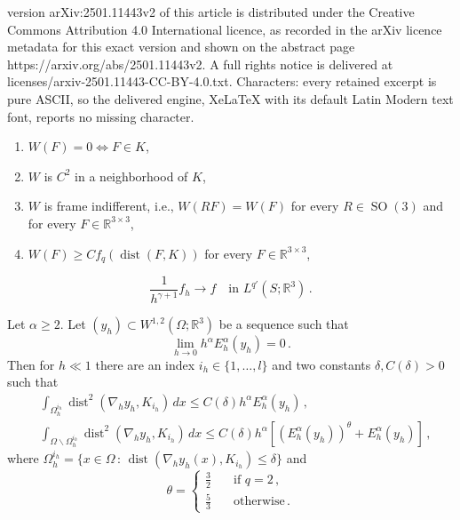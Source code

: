 \documentclass[10pt,a4paper]{amsart}
\DeclareMathOperator{\SO}{SO}
\DeclareMathOperator{\dist}{dist}
\renewcommand{\r}{\mathbb{R}}
\begin{document}
version arXiv:2501.11443v2 of this article is distributed under the Creative Commons Attribution 4.0 International licence, as recorded in the arXiv licence metadata for this exact version and shown on the abstract page https://arxiv.org/abs/2501.11443v2. A full rights notice is delivered at licenses/arxiv-2501.11443-CC-BY-4.0.txt. Characters: every retained excerpt is pure ASCII, so the delivered engine, XeLaTeX with its default Latin Modern text font, reports no missing character.
\begin{enumerate}[start=1,label={(W\arabic*)}]
    \item $W(F) = 0 \iff F \in K$, \label{item:minimization_W}
    \item $W$ is $C^2$ in a neighborhood of $K$, \label{item:regularity_W}
    \item $W$ is frame indifferent, i.e., $W(RF) = W(F)$ for every $R \in \SO(3)$ and for every $F \in \r^{3 \times 3}$, \label{item:frame_indifference}
    \item $W(F) \geq C f_q(\dist(F, K))$ for every $F \in \r^{3 \times 3}$, \label{item:lower_bound_W}
\end{enumerate}

\begin{equation}\label{eq:convergence_forces}
	\dfrac{1}{h^{\gamma+1}}f_h \to f \quad \text{in} \, \, L^{q'}(S; \r^3) \,.
\end{equation}

\begin{prop}\label{prop:compactness}
    Let $\alpha \geq 2$. Let $(y_h) \subset W^{1,2}(\Omega; \r^3)$ be a sequence such that
    \begin{equation}
        \lim_{h \to 0} h^\alpha E^\alpha_h(y_h) = 0 \label{eq:hypothesis_compactness}\,.
    \end{equation}
    Then for $h \ll 1$ there are an index $i_h \in \{1, \dots, l\}$ and two constants $\delta, C(\delta) > 0$ such that
    \begin{align}
        & \int_{\Omega_{h}^{i_{h}}} \dist^2(\nabla_h y_h, K_{i_h}) \, dx \leq C(\delta)h^\alpha E^\alpha_h(y_h) \label{eq:compactness_near_well} \,,\\
        & \int_{\Omega \backslash \Omega_h^{i_h}} \dist^2(\nabla_h y_h, K_{i_h}) \, dx \leq C(\delta)h^\alpha[{(E^\alpha_h(y_h))}^{\theta} + E^\alpha_h(y_h)] \label{eq:compactness_far_well}\,,
    \end{align}
    where $\Omega_h^{i_h} = \{x \in \Omega \, : \, \dist(\nabla_h y_h(x), K_{i_h}) \leq \delta \}$ and
    \begin{equation}\label{eq:theta}
        \theta = \begin{cases}
            \frac{3}{2} \quad & \text{if} \, \, q = 2 \,,\\
            \frac{5}{3} \quad & \text{otherwise} \,.
        \end{cases}
    \end{equation}
\end{prop}
\end{document}
